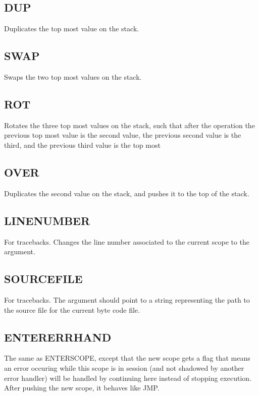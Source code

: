 \subsection{DUP}
\label{sec:dup}
Duplicates the top most value on the stack.

\subsection{SWAP}
\label{sec:swap}
Swaps the two top most values on the stack.

\subsection{ROT}
\label{sec:rot}
Rotates the three top most values on the stack, such that after the
operation the previous top most value is the second value, the previous
second value is the third, and the previous third value is the top most

\subsection{OVER}
\label{sec:over}
Duplicates the second value on the stack, and pushes it to the top of
the stack.

\subsection{LINE\textunderscore{}NUMBER}
\label{sec:linenumber}
For tracebacks. Changes the line number associated to the current scope
to the argument.

\subsection{SOURCE\textunderscore{}FILE}
\label{sec:sourcefile}
For tracebacks. The argument should point to a string representing the
path to the source file for the current byte code file.

\subsection{ENTER\textunderscore{}ERRHAND}
\label{sec:entererrhand}
The same as ENTER\textunderscore{}SCOPE, except that the new scope gets
a flag that means an error occuring while this scope is in session (and
not shadowed by another error handler) will be handled by continuing
here instead of stopping execution. After pushing the new scope, it
behaves like JMP.

